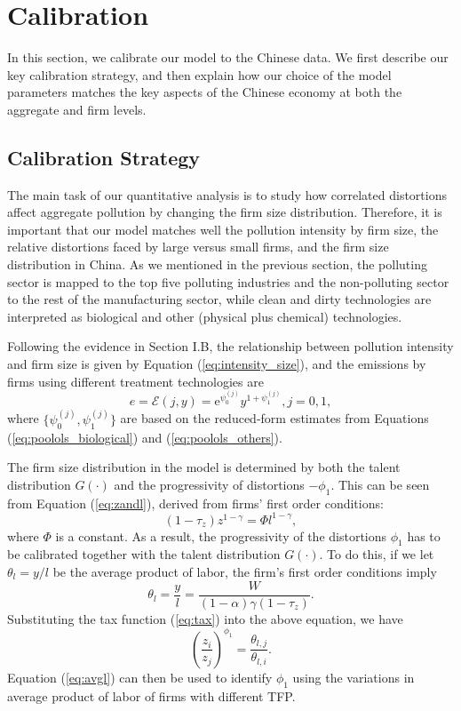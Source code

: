 \documentclass[AEJ]{AEA}
\begin{document}
\section{Calibration}
\label{sec:calibration}

In this section, we calibrate our model to the Chinese data. We first describe our key calibration strategy, and then explain how our choice of the model parameters matches the key aspects of the Chinese economy at both the aggregate and firm levels.

\subsection{Calibration Strategy}

The main task of our quantitative analysis is to study how correlated distortions affect aggregate pollution by changing the firm size distribution. Therefore, it is important that our model matches well the pollution intensity by firm size, the relative distortions faced by large versus small firms, and the firm size distribution in China. As we mentioned in the previous section, the polluting sector is mapped to the top five polluting industries and the non-polluting sector to the rest of the manufacturing sector, while clean and dirty technologies are interpreted as biological and other (physical plus chemical) technologies.

Following the evidence in Section I.B, the relationship between pollution intensity and firm size is given by Equation (\ref{eq:intensity_size}), and the emissions by firms using different treatment technologies are
\begin{equation*}
    e = \mathcal{E}(j,y) = \mathrm{e}^{\psi_0^{(j)}} y^{1+\psi_1^{(j)}}, j=0,1,
\end{equation*}
where $\{\psi_0^{(j)}, \psi_1^{(j)}\}$ are based on the reduced-form estimates from Equations (\ref{eq:poolols_biological}) and (\ref{eq:poolols_others}).

The firm size distribution in the model is determined by {both} the talent distribution $G(\cdot)$ and the progressivity of distortions $-\phi_1$. This can be seen from Equation (\ref{eq:zandl}), derived from firms' first order conditions:
\begin{equation}
\label{eq:zandl}
    (1-\tau_z)z^{1-\gamma} = \Phi l^{1-\gamma},
\end{equation}
where $\Phi$ is a constant. As a result, the progressivity of the distortions $\phi_1$ has to be calibrated together with the talent distribution $G(\cdot)$. To do this, if we let $\theta_l = y/l$ be the average product of labor, the firm's first order conditions imply
\begin{equation*}
    \theta_l = \frac{y}{l} = \frac{W}{(1-\alpha)\gamma(1-\tau_z)}.
\end{equation*}
Substituting the tax function (\ref{eq:tax}) into the above equation, we have
\begin{equation}
\label{eq:avgl}
    \left(\frac{z_i}{z_j} \right)^{\phi_1} = \frac{\theta_{l,j}}{\theta_{l,i}}.
\end{equation}
Equation (\ref{eq:avgl}) can then be used to identify $\phi_1$ using the variations in average product of labor of firms with different TFP.
\end{document}
